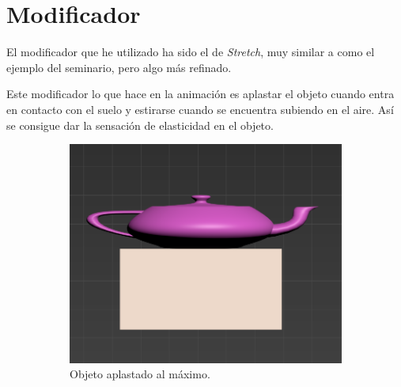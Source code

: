 \section{Modificador}

El modificador que he utilizado ha sido el de \textit{Stretch}, muy similar a como el ejemplo del seminario, pero algo más refinado.

\bigskip

Este modificador lo que hace en la animación es aplastar el objeto cuando entra en contacto con el suelo y estirarse cuando se encuentra subiendo en el aire. Así se consigue dar la sensación de elasticidad en el objeto.

\begin{figure}[H]
    \centering 
	\begin{subfigure}[t]{0.45\textwidth}
	    \centering
	    \includegraphics[width=\textwidth]{imagenes/aplastado.png}
        \caption{Objeto aplastado al máximo.}
    \end{subfigure}
    \hfill
	\begin{subfigure}[t]{0.45\textwidth}
	    \centering

\end{subfigure}
\end{figure}
